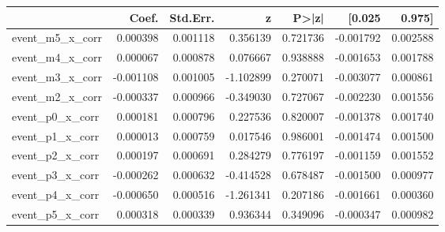 \begin{tabular}{lrrrrrr}
\toprule
 & Coef. & Std.Err. & z & P>|z| & [0.025 & 0.975] \\
\midrule
event_m5_x_corr & 0.000398 & 0.001118 & 0.356139 & 0.721736 & -0.001792 & 0.002588 \\
event_m4_x_corr & 0.000067 & 0.000878 & 0.076667 & 0.938888 & -0.001653 & 0.001788 \\
event_m3_x_corr & -0.001108 & 0.001005 & -1.102899 & 0.270071 & -0.003077 & 0.000861 \\
event_m2_x_corr & -0.000337 & 0.000966 & -0.349030 & 0.727067 & -0.002230 & 0.001556 \\
event_p0_x_corr & 0.000181 & 0.000796 & 0.227536 & 0.820007 & -0.001378 & 0.001740 \\
event_p1_x_corr & 0.000013 & 0.000759 & 0.017546 & 0.986001 & -0.001474 & 0.001500 \\
event_p2_x_corr & 0.000197 & 0.000691 & 0.284279 & 0.776197 & -0.001159 & 0.001552 \\
event_p3_x_corr & -0.000262 & 0.000632 & -0.414528 & 0.678487 & -0.001500 & 0.000977 \\
event_p4_x_corr & -0.000650 & 0.000516 & -1.261341 & 0.207186 & -0.001661 & 0.000360 \\
event_p5_x_corr & 0.000318 & 0.000339 & 0.936344 & 0.349096 & -0.000347 & 0.000982 \\
\bottomrule
\end{tabular}
